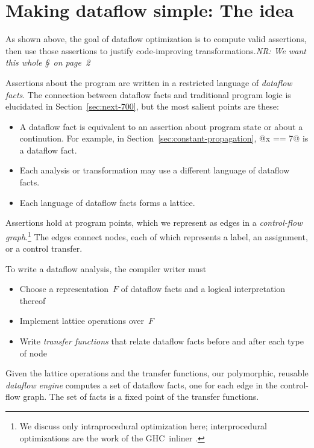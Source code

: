 \documentclass[blockstyle,preprint,nocopyrightspace]{sigplanconf}
\let\cite\citep
\newcommand{\authornote}[1]{{\em #1}}
\newcommand{\norman}[1]{\authornote{NR: #1}}
\let\remark\norman
\newcommand\secref[1]{Section~\ref{sec:#1}}
\begin{document}
  
\clearpage

\section {Making dataflow simple: The idea}

As shown above, the goal of dataflow optimization is to compute valid
assertions, then use those assertions to justify code-improving
transformations.\remark{We want this whole \S\ on page~2}

Assertions about the program are written in a restricted
language of \emph{dataflow facts}.
The connection between dataflow facts and traditional program logic is
elucidated in \secref{next-700}, but the most salient points are
these:
\begin{itemize}
\item
A dataflow fact is equivalent to an assertion about program state or
about a continution.
For example, in \secref{constant-propagation}, @x == 7@ is a dataflow
fact. 
\item
Each analysis or transformation may use a different language of
dataflow facts.
\item
Each language of dataflow facts forms a lattice.
\end{itemize}


Assertions hold at program points, which we represent as edges in
a \emph{control-flow graph}.\footnote
{We discuss only intraprocedural optimization here;
interprocedural optimizations are the work of the GHC~inliner
\cite{peyton-jones:secrets-inliner}.} 
The edges connect nodes, each of which represents a label, an assignment, or
a control transfer.

To write a dataflow analysis, the compiler
writer must 
\begin{itemize}
\item
Choose a representation~$F$ of dataflow facts and a logical interpretation
thereof
\item
Implement lattice operations over~$F$
\item
Write \emph{transfer functions} that relate dataflow facts before and
after each type of node
\end{itemize}
Given the lattice operations and the transfer functions, our
polymorphic, reusable \emph{dataflow engine} computes a
set of dataflow facts, one for each edge in the control-flow graph.
The set of facts is a fixed point of the transfer functions.
\end{document}
